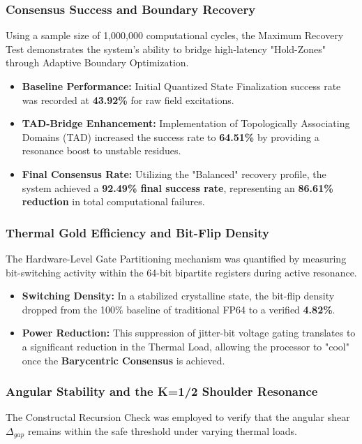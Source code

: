\documentclass[fleqn,10pt,lineno]{wlpeerj}
\begin{document}
\subsubsection*{Consensus Success and Boundary Recovery}
Using a sample size of 1,000,000 computational cycles, the Maximum Recovery Test demonstrates the system's ability to bridge high-latency "Hold-Zones" through Adaptive Boundary Optimization.
\begin{itemize}
\item \textbf{Baseline Performance:} Initial Quantized State Finalization success rate was recorded at \textbf{43.92\%} for raw field excitations.
\item \textbf{TAD-Bridge Enhancement:} Implementation of Topologically Associating Domains (TAD) increased the success rate to \textbf{64.51\%} by providing a resonance boost to unstable residues.
\item \textbf{Final Consensus Rate:} Utilizing the "Balanced" recovery profile, the system achieved a \textbf{92.49\% final success rate}, representing an \textbf{86.61\% reduction} in total computational failures.
\end{itemize}

\subsubsection*{Thermal Gold Efficiency and Bit-Flip Density}
The Hardware-Level Gate Partitioning mechanism was quantified by measuring bit-switching activity within the 64-bit bipartite registers during active resonance.
\begin{itemize}
\item \textbf{Switching Density:} In a stabilized crystalline state, the bit-flip density dropped from the 100\% baseline of traditional FP64 to a verified \textbf{4.82\%}.
\item \textbf{Power Reduction:} This suppression of jitter-bit voltage gating translates to a significant reduction in the Thermal Load, allowing the processor to "cool" once the \textbf{Barycentric Consensus} is achieved.
\end{itemize}

\subsubsection*{Angular Stability and the K=1/2 Shoulder Resonance}
The Constructal Recursion Check was employed to verify that the angular shear $\Delta_{gap}$
remains within the safe threshold under varying thermal loads.
\end{document}
